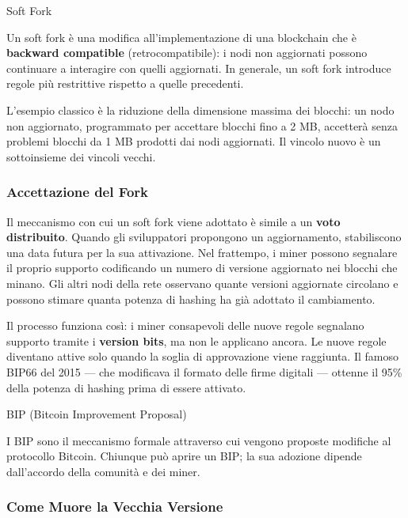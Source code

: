 \documentclass[
  italian,
  openany]{book}
\begin{document}
\begin{calloutdefinition}{Soft Fork}

Un soft fork è una modifica all'implementazione di una blockchain che è
\textbf{backward compatible} (retrocompatibile): i nodi non aggiornati
possono continuare a interagire con quelli aggiornati. In generale, un
soft fork introduce regole più restrittive rispetto a quelle precedenti.

\end{calloutdefinition}

L'esempio classico è la riduzione della dimensione massima dei blocchi:
un nodo non aggiornato, programmato per accettare blocchi fino a 2 MB,
accetterà senza problemi blocchi da 1 MB prodotti dai nodi aggiornati.
Il vincolo nuovo è un sottoinsieme dei vincoli vecchi.

\subsubsection{Accettazione del Fork}\label{accettazione-del-fork}

Il meccanismo con cui un soft fork viene adottato è simile a un
\textbf{voto distribuito}. Quando gli sviluppatori propongono un
aggiornamento, stabiliscono una data futura per la sua attivazione. Nel
frattempo, i miner possono segnalare il proprio supporto codificando un
numero di versione aggiornato nei blocchi che minano. Gli altri nodi
della rete osservano quante versioni aggiornate circolano e possono
stimare quanta potenza di hashing ha già adottato il cambiamento.

Il processo funziona così: i miner consapevoli delle nuove regole
segnalano supporto tramite i \textbf{version bits}, ma non le applicano
ancora. Le nuove regole diventano attive solo quando la soglia di
approvazione viene raggiunta. Il famoso BIP66 del 2015 --- che
modificava il formato delle firme digitali --- ottenne il 95\% della
potenza di hashing prima di essere attivato.

\begin{calloutnote}{BIP (Bitcoin Improvement Proposal)}

I BIP sono il meccanismo formale attraverso cui vengono proposte
modifiche al protocollo Bitcoin. Chiunque può aprire un BIP; la sua
adozione dipende dall'accordo della comunità e dei miner.

\end{calloutnote}

\subsubsection{Come Muore la Vecchia
Versione}\label{come-muore-la-vecchia-versione}
\end{document}
